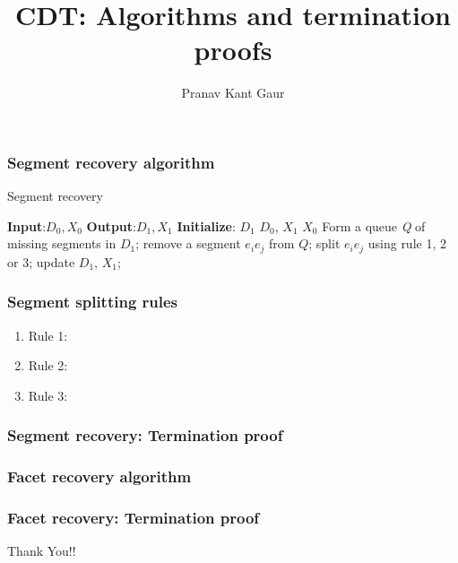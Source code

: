 \documentclass{beamer}
\title[CDT]{CDT: Algorithms and termination proofs}
\author{Pranav Kant Gaur}
\institute[BARC, India]{Computer Division, \newline Bhabha Atomic Research Centre, Mumbai, India}
\date{}
\begin{document}
\begin{frame}
  \titlepage
\end{frame}

\begin{frame}
\frametitle{Segment recovery algorithm}
\begin{algorithm}[H]
\caption{Segment recovery}\label{euclid}
\begin{algorithmic}[1]
	\State \textbf{Input}:$D_0, X_0$
	\State \textbf{Output}:$D_1, X_1$
	\State \textbf{Initialize}:
	\State $D_1$ \gets $D_0$, $X_1$ \gets $X_0$
	\Repeat
	\State Form a queue \textit{Q} of missing segments in $D_1$;
	\State remove a segment $e_{i}e_{j}$ from $Q$;
	\State split $e_{i}e_{j}$ using rule 1, 2 or 3;
	\State update $D_1$, $X_1$;
	\EndWhile
\EndProcedure
\end{algorithmic}
\end{algorithm}
\end{frame}


\begin{frame}
\frametitle{Segment splitting rules}
\begin{enumerate}
	\item Rule 1:
	\item Rule 2:	
	\item Rule 3:	
\end{enumerate}
\end{frame}

\begin{frame}
\frametitle{Segment recovery: Termination proof}
\end{frame}

\begin{frame}
	\frametitle{Facet recovery algorithm}	
\end{frame}

\begin{frame}
\frametitle{Facet recovery: Termination proof}
\end{frame}

\begin{frame}
	Thank You!!
\end{frame}
\end{document}
